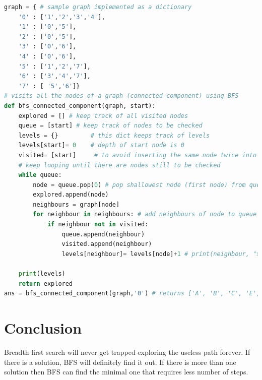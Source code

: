 \documentclass[11pt]{article}            %
\begin{document}
\begin{lstlisting}[language=Python]
graph = { # sample graph implemented as a dictionary
    '0' : ['1','2','3','4'],
    '1' : ['0','5'],
    '2' : ['0','5'],
    '3' : ['0','6'],
    '4' : ['0','6'],
    '5' : ['1','2','7'],
    '6' : ['3','4','7'],
    '7' : [ '5','6']}
# visits all the nodes of a graph (connected component) using BFS
def bfs_connected_component(graph, start):
    explored = [] # keep track of all visited nodes
    queue = [start] # keep track of nodes to be checked
    levels = {}         # this dict keeps track of levels
    levels[start]= 0    # depth of start node is 0
    visited= [start]     # to avoid inserting the same node twice into the queue
    # keep looping until there are nodes still to be checked
    while queue:
        node = queue.pop(0) # pop shallowest node (first node) from queue
        explored.append(node)
        neighbours = graph[node]
        for neighbour in neighbours: # add neighbours of node to queue
            if neighbour not in visited:
                queue.append(neighbour)
                visited.append(neighbour)
                levels[neighbour]= levels[node]+1 # print(neighbour, ">>", levels[neighbour])
                
    print(levels)
    return explored
ans = bfs_connected_component(graph,'0') # returns ['A', 'B', 'C', 'E', 'D', 'F', 'G']

\end{lstlisting}

\section{Conclusion}  
Breadth first search will never get trapped exploring the useless path forever.
If there is a solution, BFS will definitely find it out.
If there is more than one solution then BFS can find the minimal one that requires less number of steps.
   

 
\end{document}
